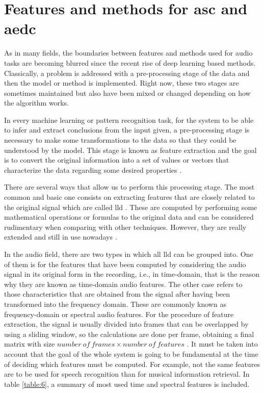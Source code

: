 
\section{Features and methods for \acrshort{asc} and \acrshort{aedc}}
\label{section:features-and-methods-for-asc-aedc}
	
	As in many fields, the boundaries between features and methods used for audio tasks are becoming blurred since the recent rise of deep learning based methods. Classically, a problem is addressed with a pre-processing stage of the data and then the model or method is implemented. Right now, these two stages are sometimes maintained but also have been mixed or changed depending on how the algorithm works.


	In every machine learning or pattern recognition task, for the system to be able to infer and extract conclusions from the input given, a pre-processing stage is necessary to make some transformations to the data so that they could be understood by the model. This stage is known as feature extraction and the goal is to convert the original information into a set of values or vectors that characterize the data regarding some desired properties \cite{Giannakopoulos2014}.
	
	There are several ways that allow us to perform this processing stage. The most common and basic one consists on extracting features that are closely related to the original signal which are called \acrfull{lld}  \cite{Amatriain2004}. These are computed by performing some mathematical operations or formulas to the original data and can be considered rudimentary when comparing with other techniques. However, they are really extended and still in use nowadays \cite{Marr1982}. 

	In the audio field, there are two types in which all \acrshort{lld} can be grouped into. One of them is for the features that have been computed by considering the audio signal in its original form in the recording, i.e., in time-domain, that is the reason why they are known as time-domain audio features. The other case refers to those characteristics that are obtained from the signal after having been transformed into the frequency domain. These are commonly known as frequency-domain or spectral audio features. For the procedure of feature extraction, the signal is usually divided into frames that can be overlapped by using a sliding window, so the calculations are done per frame, obtaining a final matrix with size $number\ of\ frames \times number\ of\ features$ \cite{Giannakopoulos2014}. It must be taken into account that the goal of the whole system is going to be fundamental at the time of deciding which features must be computed. For example, not the same features are to be used for speech recognition than for musical information retrieval. In table \ref{table:6}, a summary of most used time and spectral features is included.
	

